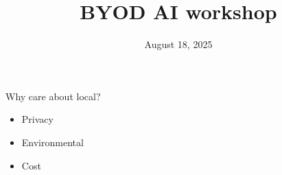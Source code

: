 \documentclass{beamer}
\title{BYOD AI workshop}
\date{August 18, 2025}
\begin{document}
\begin{frame}
	\maketitle
\end{frame}

\begin{frame}
	Why care about local?
\end{frame}

\begin{frame}
	\begin{itemize}
		\item Privacy
		\pause
		\item Environmental
		\pause
		\item Cost
	\end{itemize}
\end{frame}

\begin{frame}[plain]
\end{frame}
\end{document}
